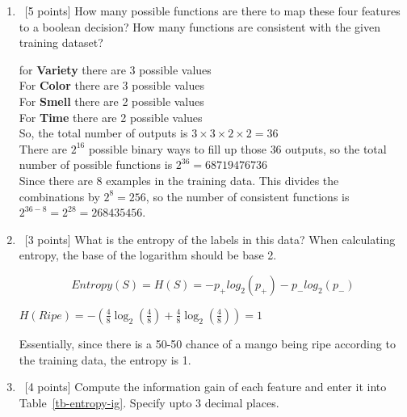 \begin{enumerate}
  \begin{enumerate}
  \item~[5 points] How many possible functions are there to map these four features to a boolean decision? How many functions are consistent with the given training dataset?

  {\color{red}
    for \textbf{Variety} there are 3 possible values \\
    For \textbf{Color} there are 3 possible values \\
    For \textbf{Smell} there are 2 possible values \\
    For \textbf{Time} there are 2 possible values \\
    So, the total number of outputs is $3 \times 3 \times 2 \times 2 = 36$ \\
    There are $2^16$ possible binary ways to fill up those $36$ outputs, so the total number of possible functions is $2^{36} = 68719476736$ \\
    Since there are 8 examples in the training data. This divides the combinations by $2^8 = 256$, so the number of consistent functions is $2^{36 - 8} = 2^{28} = 268435456$.
  }

  \item~[3 points] What is the entropy of the labels in this data? When calculating entropy, the base of the logarithm should be base 2.

  {\color{red}

    \begin{equation}
      Entropy(S) = H(S) = -p_+log_2(p_+)-p_-log_2(p_-)
    \end{equation}

    $H(Ripe) = -\left(\frac{4}{8}\log_2\left(\frac{4}{8}\right) + \frac{4}{8}\log_2\left(\frac{4}{8}\right)\right) = 1$

    Essentially, since there is a 50-50 chance of a mango being ripe according to the training data, the entropy is 1.
  }

  \item~[4 points] Compute the information gain of each feature and enter it
    into Table~\ref{tb-entropy-ig}. Specify upto 3 decimal places.
    \begin{table}[h]
      \centering
      \begin{tabular}{c|c}


\end{tabular}
\end{table}
\end{enumerate}
\end{enumerate}
